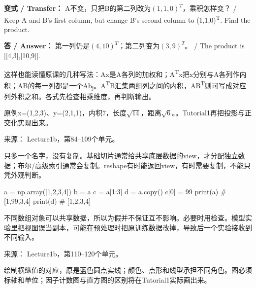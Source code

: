 \textbf{变式 / Transfer：} A不变，只把B的第二列改为\((1,1,0)^T\)，乘积怎样变？ / Keep A and B's first column, but change B's second column to (1,1,0)\textsuperscript{T}. Find the product.


\textbf{答 / Answer：} 第一列仍是\((4,10)^T\)；第二列变为\((3,9)^T\)。 / The product is [[4,3],[10,9]].


这样也能读懂原课的几种写法：Ax是A各列的加权和；A\textsuperscript{T}x把x分别与A各列作内积；AB的每一列都是一个Ab\textsubscript{j}。A\textsuperscript{T}B汇集两组列之间的内积，AB\textsuperscript{T}则可写成对应列外积之和。各式先检查相乘维度，再判断输出。


原例x=(1,2,3)、y=(2,1,1)，内积7，长度\(\sqrt{14}\)，距离\(\sqrt{6}\)。。Tutorial1再把投影与正交化实现出来。


来源： Lecture1b，第84–109个单元。








只多一个名字，没有复制。基础切片通常给共享底层数据的view，才分配独立数据；布尔/高级索引通常会复制。reshape有时能返回view，有时需要复制，不能只凭外观判断。



\begin{StudyCode}
a = np.array([1,2,3,4])
b = a
c = a[1:3]
d = a.copy()
c[0] = 99
print(a)        # [1,99,3,4]
print(d)        # [1,2,3,4]
\end{StudyCode}


不同数组对象可以共享数据，所以为假并不保证互不影响。必要时用检查。模型实验里把视图误当副本，可能在预处理时把原训练数据改掉，导致后一个实验接收到不同输入。


来源： Lecture1b，第110–120个单元。








绘制横纵值的对应，原是蓝色圆点实线；颜色、点形和线型承担不同角色。图必须标轴和单位；因子计数图与直方图的区别将在Tutorial1实际画出来。


